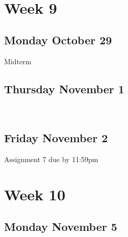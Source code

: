 \documentclass[]{book}
\let\originaltabular\tabular
\let\endoriginaltabular\endtabular
\renewenvironment{tabular}[1]{%
  \begingroup%
  \centering%
  \originaltabular{#1}}%
  {\endoriginaltabular\endgroup}
\theoremstyle{definition}
\theoremstyle{definition}
\theoremstyle{definition}
\theoremstyle{remark}
\begin{document}
\begin{table}[H]
\centering
\begin{tabular}{l}
\hline
\\
\hline
\end{tabular}
\end{table}

\section{Week 9}\label{week-9}

\subsection{Monday October 29}\label{monday-october-29}

\begin{table}[H]
\centering
\begin{tabular}{l}
\hline
Midterm\\
\hline
\end{tabular}
\end{table}

\subsection{Thursday November 1}\label{thursday-november-1}

\begin{table}[H]
\centering
\begin{tabular}{l}
\hline
\\
\hline
\end{tabular}
\end{table}

\subsection{Friday November 2}\label{friday-november-2}

\begin{table}[H]
\centering
\begin{tabular}{l}
\hline
Assignment 7 due by 11:59pm\\
\hline
\end{tabular}
\end{table}

\section{Week 10}\label{week-10}

\subsection{Monday November 5}\label{monday-november-5}
\end{document}
